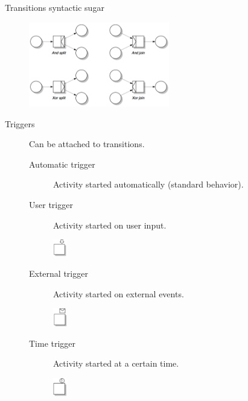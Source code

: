 \begin{description}
    \item[Transitions syntactic sugar]  \phantom{}
        \begin{center}
            \includegraphics[width=0.5\textwidth]{img/workflow_nets_transitions.png}
        \end{center}

    \item[Triggers]  
        Can be attached to transitions.
        \begin{description}
            \item[Automatic trigger] Activity started automatically (standard behavior).

            \item[User trigger] Activity started on user input.
                \begin{center}
                    \includegraphics[width=0.6cm]{img/workflow_nets_user_trigger.png}
                \end{center}

            \item[External trigger] Activity started on external events.
                \begin{center}
                    \includegraphics[width=0.6cm]{img/workflow_nets_external_trigger.png}
                \end{center}

            \item[Time trigger] Activity started at a certain time.
                \begin{center}
                    \includegraphics[width=0.6cm]{img/workflow_nets_time_trigger.png}
                \end{center}
        \end{description}
\end{description}


